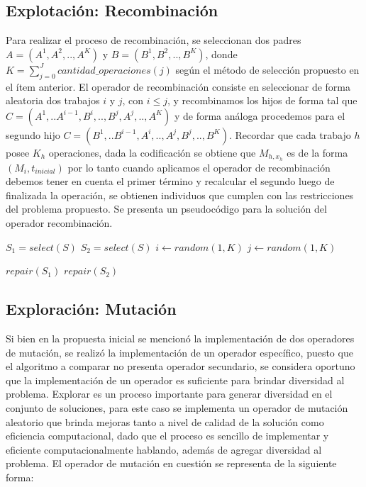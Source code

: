 \documentclass[journal]{IEEEtran}
\begin{document}
\subsection{Explotación: Recombinación}
Para realizar el proceso de recombinación, se seleccionan dos padres $A=(A^{1},A^{2},..,A^{K})$ y $B=(B^{1},B^{2},..,B^{K})$, donde $K=\sum_{j=0}^{J}cantidad\_operaciones(j)$ según el método de selección propuesto en el ítem anterior. El operador de recombinación consiste en seleccionar de forma aleatoria dos trabajos $i$ y $j$, con $i \leq j$, y recombinamos los hijos de forma tal que $C=(A^{1},..A^{i-1},B^{i},..,B^{j},A^{j},..,A^{K})$ y de forma análoga procedemos para el segundo hijo $C=(B^{1},..B^{i-1},A^{i},..,A^{j},B^{j},..,B^{K})$.
Recordar que cada trabajo $h$ posee $K_{h}$ operaciones, dada la codificación se obtiene que $M_{h, x_{h}}$ es de la forma $(M_{i},t_{inicial})$ por lo tanto cuando aplicamos el operador de recombinación debemos tener en cuenta el primer término y recalcular el segundo luego de finalizada la operación, se obtienen individuos que cumplen con las restricciones del problema propuesto.
Se presenta un pseudocódigo para la solución del operador recombinación.
\\
\begin{algorithmic}
  \State $S_1= select(S)$
  \State $S_2= select(S)$
  \State $i\gets random(1,K)$
  \State $j \gets random(1,K)$
  
  \EndFor
  
  \State $repair(S_1)$
  \State $repair(S_2)$
\end{algorithmic}



\subsection{Exploración: Mutación}
\label{subsec:mutacion}
Si bien en la propuesta inicial se mencionó la implementación de dos operadores de mutación, se realizó la implementación de un operador específico, puesto que el algoritmo a comparar no presenta operador secundario, se considera oportuno que la implementación de un operador es suficiente para brindar diversidad al problema.
Explorar es un proceso importante para generar diversidad en el conjunto de soluciones, para este caso se implementa un operador de mutación aleatorio que brinda mejoras tanto a nivel de calidad de la solución como eficiencia computacional, dado que el proceso es sencillo de implementar y eficiente computacionalmente hablando, además de agregar diversidad al problema. El operador de mutación en cuestión se representa de la siguiente forma:
\end{document}
